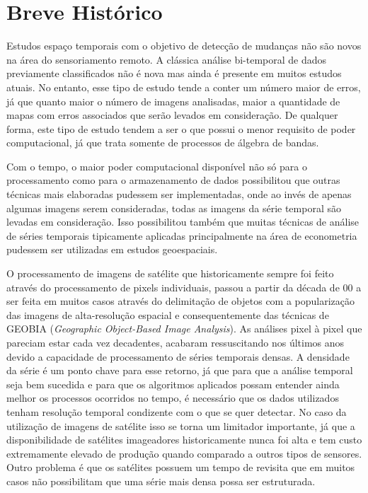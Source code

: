 \documentclass{article}
\begin{document}
\section{Breve Histórico}

Estudos espaço temporais com o objetivo de detecção de mudanças não são novos na área do sensoriamento remoto. A clássica análise bi-temporal de dados previamente classificados não é nova mas ainda é presente em muitos estudos atuais. No entanto, esse tipo de estudo tende a conter um número maior de erros, já que quanto maior o número de imagens analisadas, maior a quantidade de mapas com erros associados que serão levados em consideração. De qualquer forma, este tipo de estudo tendem a ser o que possui o menor requisito de poder computacional, já que trata somente de processos de álgebra de bandas.
\par
Com o tempo, o maior poder computacional disponível não só para o processamento como para o armazenamento de dados possibilitou que outras técnicas mais elaboradas pudessem ser implementadas, onde ao invés de apenas algumas imagens serem consideradas, todas as imagens da série temporal são levadas em consideração. Isso possibilitou também que muitas técnicas de análise de séries temporais tipicamente aplicadas principalmente na área de econometria pudessem ser utilizadas em estudos geoespaciais.
\par
O processamento de imagens de satélite que historicamente sempre foi feito através do processamento de pixels individuais, passou a partir da década de 00 a ser feita em muitos casos através do delimitação de objetos com a popularização das imagens de alta-resolução espacial e consequentemente das técnicas de GEOBIA (\textit{Geographic Object-Based Image Analysis}). As análises pixel à pixel que pareciam estar cada vez decadentes, acabaram ressuscitando nos últimos anos devido a capacidade de processamento de séries temporais densas. A densidade da série é um ponto chave para esse retorno, já que para que a análise temporal seja bem sucedida e para que os algoritmos aplicados possam entender ainda melhor os processos ocorridos no tempo, é necessário que os dados utilizados tenham resolução temporal condizente com o que se quer detectar. No caso da utilização de imagens de satélite isso se torna um limitador importante, já que a disponibilidade de satélites imageadores historicamente nunca foi alta e tem custo extremamente elevado de produção quando comparado a outros tipos de sensores. Outro problema é que os satélites possuem um tempo de revisita que em muitos casos não possibilitam que uma série mais densa possa ser estruturada. 
\end{document}
